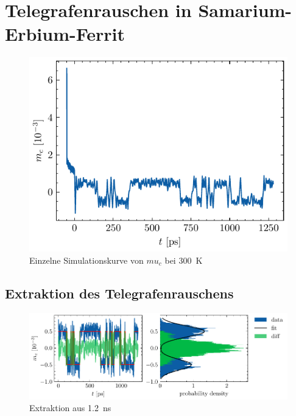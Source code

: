 \documentclass[main.tex]{subfiles}
\begin{document}
\newpage
\section{Telegrafenrauschen in Samarium-Erbium-Ferrit}

\begin{figure}[h]
    \centering
    \includegraphics{bilder/plots/theo-vis/example-telegraph-sim.pdf}
    \caption{Einzelne Simulationskurve von \(mu_c\) bei \SI{300}{\kelvin}}\label{fig:bsp-run}
\end{figure}


\subsection{Extraktion des Telegrafenrauschens}

\begin{figure}[h]
    \centering
    \includegraphics{bilder/plots/Bz_0mT/mc_fit_hist_part2_26.03meV.pdf}
    \caption{Extraktion aus \SI{1,2}{\nano\s}}\label{fig:Extraktion-ausschnitt}
\end{figure}
\end{document}
